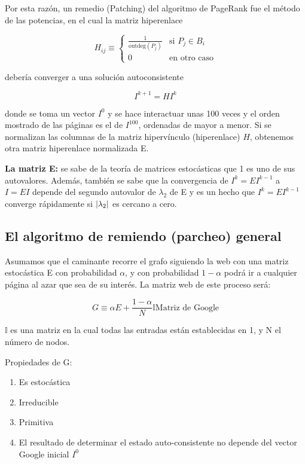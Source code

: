 \documentclass[11pt, spanish]{report}
\begin{document}
Por esta razón, un remedio (Patching) del algoritmo de PageRank fue el método de
las potencias, en el cual la matriz hiperenlace

\[
H_{ij} \equiv \begin{cases}
\frac{1}{\mathrm{outdeg}(P_j)} & \text{si } P_j \in B_i \\
0 & \text{en otro caso}
\end{cases}
\]

debería converger a una solución autoconsistente

\[
I^{k+1} = H I^k
\]

donde se toma un vector $I^{0}$ y se hace interactuar unas 100 veces y el orden
mostrado de las páginas es el de $I^{100}$, ordenadas de mayor a menor. Si se
normalizan las columnas de la matriz hipervínculo (hiperenlace) $H$, obtenemos
otra matriz hiperenlace normalizada E.

\textbf{La matriz E:} se sabe de la teoría de matrices estocásticas que 1 es uno
de sus autovalores. Además, también se sabe que la convergencia de $I^k = E
I^{k-1}$ a $I = E I$ depende del segundo autovalor de $\lambda_2$ de E y es un
hecho que $I^k = E I^{k-1}$ converge rápidamente si $\abs{\lambda_2}$ es
cercano a cero.

\subsection{El algoritmo de remiendo (parcheo) general}

Asumamos que el caminante recorre el grafo siguiendo la web con una matriz
estocástica E con probabilidad $\alpha$, y con probabilidad $1-\alpha$ podrá ir
a cualquier página al azar que sea de su interés. La matriz web de este proceso
será:

\[
G \equiv \alpha E + \frac{1-\alpha}{N} \mathds{I} \text{Matriz de Google}
\]

$\mathds{I}$ es una matriz en la cual todas las entradas están establecidas en
1, y N el número de nodos.

Propiedades de G:
\begin{enumerate}
\item Es estocástica
\item Irreducible
\item Primitiva
\item El resultado de determinar el estado auto-consistente no depende del
    vector Google inicial $I^0$
\end{enumerate}
\end{document}

